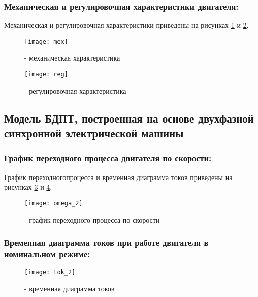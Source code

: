 \newpage

\subsubsection{Механическая и регулировочная характеристики двигателя:}
Механическая и регулировочная характеристики приведены на рисунках \ref{pic:pic_5} и \ref{pic:pic_6}.
\begin{figure}[H]
	\begin{center}
		\texttt{[image: mex]}
		\caption{- механическая характеристика} 
		\label{pic:pic_5} %
	\end{center}
\end{figure}

\begin{figure}[H]
	\begin{center}
		\texttt{[image: reg]}
		\caption{- регулировочная характеристика} 
		\label{pic:pic_6} %
	\end{center}
\end{figure}
\subsection{Модель БДПТ, построенная на основе двухфазной синхронной электрической машины}

\subsubsection{График переходного процесса двигателя по скорости:}
График переходногопроцесса и временная диаграмма токов приведены на рисунках \ref{pic:pic_7} и \ref{pic:pic_8}.
\begin{figure}[H]
	\begin{center}
		\texttt{[image: omega\_2]}
		\caption{- график переходного процесса по скорости} 
		\label{pic:pic_7} %
	\end{center}
\end{figure}

\subsubsection{Временная диаграмма токов при работе двигателя в номинальном режиме:}

\begin{figure}[H]
	\begin{center}
		\texttt{[image: tok\_2]}
		\caption{- временная диаграмма токов} 
		\label{pic:pic_8} %
	\end{center}
\end{figure}
\newpage

